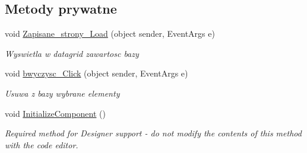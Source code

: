 \subsection*{Metody prywatne}
\begin{DoxyCompactItemize}
\item 
void \mbox{\hyperlink{class_proj__przegladarka_1_1_zapisane__strony_ad24df49b7b0ef00baac855d3a67582b7}{Zapisane\+\_\+strony\+\_\+\+Load}} (object sender, Event\+Args e)
\begin{DoxyCompactList}\small\item\em Wyswietla w datagrid zawartosc bazy \end{DoxyCompactList}\item 
void \mbox{\hyperlink{class_proj__przegladarka_1_1_zapisane__strony_a3d39dee3acf271f45e03b0ccd8630554}{bwyczysc\+\_\+\+Click}} (object sender, Event\+Args e)
\begin{DoxyCompactList}\small\item\em Usuwa z bazy wybrane elementy \end{DoxyCompactList}\item 
void \mbox{\hyperlink{class_proj__przegladarka_1_1_zapisane__strony_aabe9e54fa0cd5c16ae40aee989989c44}{Initialize\+Component}} ()
\begin{DoxyCompactList}\small\item\em Required method for Designer support -\/ do not modify the contents of this method with the code editor. \end{DoxyCompactList}\end{DoxyCompactItemize}
